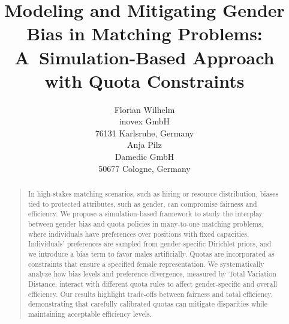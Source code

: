\documentclass[letterpaper]{article}
\begin{document}
\title{Modeling and Mitigating Gender Bias in Matching Problems:\\ A~Simulation-Based Approach with Quota Constraints}
\author{Florian Wilhelm\\
inovex GmbH\\
76131 Karlsruhe, Germany\\
\And Anja Pilz\\
Damedic GmbH\\
50677 Cologne, Germany\\ %
}


\maketitle
\begin{abstract}
\begin{quote}
In high-stakes matching scenarios, such as hiring or resource distribution, biases tied to protected attributes, such as gender, can compromise fairness and efficiency. We propose a simulation-based framework to study the interplay between gender bias and quota policies in many-to-one matching problems, where individuals have preferences over positions with fixed capacities. Individuals' preferences are sampled from gender-specific Dirichlet priors, and we introduce a bias term to favor males artificially. Quotas are incorporated as constraints that ensure a specified female representation. We systematically analyze how bias levels and preference divergence, measured by Total Variation Distance, interact with different quota rules to affect gender-specific and overall efficiency. Our results highlight trade-offs between fairness and total efficiency, demonstrating that carefully calibrated quotas can mitigate disparities while maintaining acceptable efficiency levels. 
\end{quote}
\end{abstract}
\end{document}
